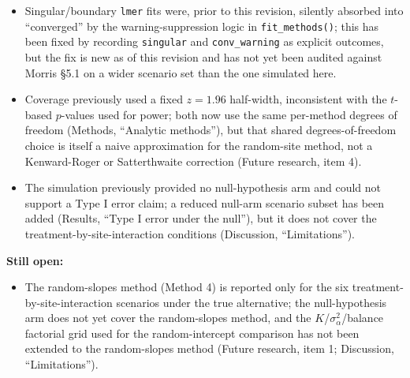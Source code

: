 \documentclass[
  11pt,
]{article}
\providecommand{\tightlist}{%
  \setlength{\itemsep}{0pt}\setlength{\parskip}{0pt}}
\begin{document}
\begin{itemize}
\tightlist
\item
  Singular/boundary \texttt{lmer} fits were, prior to this revision, silently
  absorbed into ``converged'' by the warning-suppression logic in
  \texttt{fit\_methods()}; this has been fixed by recording \texttt{singular} and
  \texttt{conv\_warning} as explicit outcomes, but the fix is new as of this
  revision and has not yet been audited against Morris §5.1 on a
  wider scenario set than the one simulated here.
\item
  Coverage previously used a fixed \(z = 1.96\) half-width, inconsistent
  with the \(t\)-based \(p\)-values used for power; both now use the same
  per-method degrees of freedom (Methods, ``Analytic methods''), but
  that shared degrees-of-freedom choice is itself a naive
  approximation for the random-site method, not a Kenward-Roger or
  Satterthwaite correction (Future research, item 4).
\item
  The simulation previously provided no null-hypothesis arm and could
  not support a Type I error claim; a reduced null-arm scenario
  subset has been added (Results, ``Type I error under the null''), but
  it does not cover the treatment-by-site-interaction conditions
  (Discussion, ``Limitations'').
\end{itemize}

\textbf{Still open:}

\begin{itemize}
\tightlist
\item
  The random-slopes method (Method 4) is reported only for the six
  treatment-by-site-interaction scenarios under the true alternative;
  the null-hypothesis arm does not yet cover the random-slopes
  method, and the \(K\)/\(\sigma^2_\alpha\)/balance factorial grid used
  for the random-intercept comparison has not been extended to the
  random-slopes method (Future research, item 1; Discussion,
  ``Limitations'').
\end{itemize}
\end{document}
